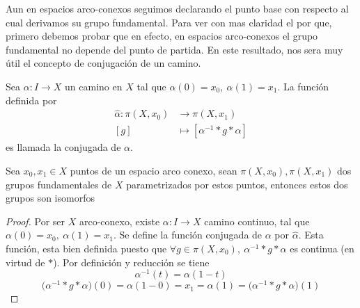 {Aun en espacios arco-conexos seguimos declarando el punto base con
respecto al cual derivamos su grupo fundamental. Para ver con mas
claridad el por que, primero debemos probar que en efecto, en espacios
arco-conexos el grupo fundamental no depende del punto de partida. En
este resultado, nos sera muy útil el concepto de conjugación de un
camino.
\begin{definicion} \label{def:conjugada}
  Sea \(\alpha : I \to X\) un camino en \(X\) tal que \(\alpha (0) =
  x_0,\ \alpha(1) = x_1\). La función definida por
  \begin{align*}
    \hat \alpha : \pi (X, x_0) &\longrightarrow \pi (X, x_1) \\
    [g] &\longmapsto [ \alpha^{-1} * g * \alpha ]
  \end{align*}
  es llamada la conjugada de \(\alpha\).
\end{definicion}
\begin{teorema} \label{not:alpha-hat}
  Sea \(x_0 , x_1 \in X\) puntos de un espacio arco conexo, sean \(\pi
  (X, x_0), \pi (X, x_1)\) dos grupos fundamentales de \(X\)
  parametrizados por estos puntos, entonces estos dos grupos son isomorfos
\end{teorema}
\begin{proof}
  Por ser \(X\) arco-conexo, existe \(\alpha : I \to X\) camino
  continuo, tal que \(\alpha (0) = x_0,\ \alpha (1) = x_1\). Se define
  la función conjugada de \(\alpha\) por \(\hat \alpha\).
  Esta función, esta bien definida puesto que \(\forall g \in \pi (X,
  x_0),\ \alpha^{-1} * g * \alpha \) es continua (en virtud de \(*\)).
  Por definición y reducción se tiene
  \[ \alpha^{-1} (t) = \alpha (1 - t)\]
  \[\big(\alpha^{-1} * g * \alpha \big) (0) = \alpha (1 - 0) = x_1 = \alpha (1) =
    \big(\alpha^{-1} * g * \alpha \big) (1)\]


\end{proof}}
